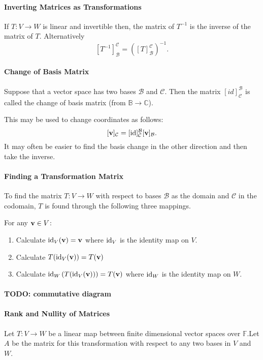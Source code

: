 \paragraph{Inverting Matrices as Transformations}
If \(T: V \to W\) is linear and invertible then, the matrix of \(T^{-1}\)
is the inverse of the matrix of \(T\).
Alternatively \[
    [T^{-1}]_\mathcal{B}^\mathcal{C}
    =
    \left( [T]_\mathcal{B}^\mathcal{C} \right)^{-1}
.\]

\paragraph{Change of Basis Matrix}
Suppose that a vector space has two bases \(\mathcal{B}\) and \(\mathcal{C}\).
Then the matrix \([id]_\mathcal{C}^\mathcal{B}\) is called the
change of basis matrix (from \(\mathbb{B} \to \mathbb{C}\)).

This may be used to change coordinates as follows: \[
    [\mathbf{v}]_\mathcal{C}
    =
    [\mathrm{id}]_\mathcal{C}^\mathcal{B} [\mathbf{v}]_\mathcal{B}
.\]
It may often be easier to find the basis change in the other direction and
then take the inverse.

\paragraph{Finding a Transformation Matrix}
To find the matrix \(T: V \to W\) with respect to bases \(\mathcal{B}\)
as the domain and \(\mathcal{C}\) in the codomain, \(T\) is found through the
following three mappings.

For any  \(\mathbf{v} \in V\):
\begin{enumerate}
    \item Calculate \(\mathrm{id}_V (\mathbf{v}) = \mathbf{v}\) where \(\mathrm{id}_V\) is the identity
        map on \(V\).
    \item Calculate \(T(\mathrm{id}_V(\mathbf{v})) = T(\mathbf{v}) \)
    \item Calculate \(
        \mathrm{id}_W \left( T (\mathrm{id}_V(\mathbf{v})) \right) = T(\mathbf{v})\)
        where \(\mathrm{id}_W\) is the identity map on \(W\).
\end{enumerate}

\paragraph{TODO: commutative diagram}

\paragraph{Rank and Nullity of Matrices}
Let \(T: V \to W\) be a linear map between finite dimensional vector spaces
over \(\mathbb{F}\).Let \(A\) be the matrix for this transformation
with respect to any two bases in \(V\) and \(W\).

